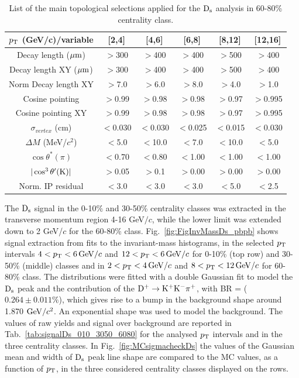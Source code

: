 \begin{table}[!h]
 \begin{center}
  \begin{tabular}{|c|c|c|c|c|c|}
\hline
$p_{\rm T}$ (GeV/c)/variable & [2,4] & [4,6] & [6,8] & [8,12] & [12,16] \\
\hline
\hline
Decay length ($\mathrm{\mu m}$)                 & $>$300 & $>$400 & $>$400 & $>$500 & $>$400\\
\hline
Decay length XY ($\mathrm{\mu m}$)            & $>$300 & $>$400 & $>$400 & $>$500 & $>$400\\
\hline
Norm Decay length XY                   & $>$7.0& $>$6.0 & $>$8.0 & $>$4.0 & $>$1.0\\
\hline
Cosine pointing                               & $>$0.99 & $>$0.98 & $>$0.98 & $>$0.97 & $>$0.995\\
\hline
Cosine pointing XY                          & $>$0.99 & $>$0.98 & $>$0.98 & $>$0.97 & $>$0.995\\
\hline
$\sigma_{vertex}$  (cm)                   & $<$0.030 & $<$0.030 & $<$0.025 & $<$0.015 & $<$0.030\\
\hline
$\Delta M$ (MeV/$c^{2}$) & $<$5.0 & $<$10.0 & $<$7.0 & $<$10.0 & $<$5.0\\
\hline
$\cos \theta^*(\pi)$                             & $<$0.70 & $<$0.80 & $<$1.00 & $<$1.00 & $<$1.00\\
\hline
$|\cos^3 \theta^\prime({\rm K})|$        & $>$0.05 & $>$0.1 & $>$0.00 & $>$0.00 & $>$0.00\\
\hline
Norm. IP residual                               & $<$3.0 & $<$3.0 & $<$3.0 & $<$5.0 & $<$2.5 \\[1ex]
\hline
  \end{tabular}
 \caption{List of the main topological selections applied for the
   ${\rm D_s}$ analysis in 60-80\% centrality class.}
 \label{tab:topologicalselections_ds_6080}
 \end{center}
\end{table}

 The ${\rm D_s}$ signal in the 0-10$\%$ and 30-50\% centrality classes was extracted in the transverse
momentum region 4-16 GeV$/c$, while the lower limit was extended down to 2 GeV/$c$
for the 60-80\% class. Fig.~\ref{fig:FigInvMassDs_pbpb} shows signal extraction
from fits to the invariant-mass histograms, in the selected $p_{\rm T}$ intervals
$4 < p_{\rm T} <6 \, \mathrm{GeV}/c$ and $12 < p_{\rm T} < 6 \, \mathrm{GeV}/c$ for 0-10\% (top row) and 30-50\%
(middle) classes and in $2 < p_{\rm T} < 4 \, \mathrm{GeV}/c$ and  $8 < p_{\rm T} < 12 \, \mathrm{GeV}/c$ for
60-80\% class. The distributions were fitted with a double Gaussian fit to model
the ${\rm D_s}$ peak and the contribution of the ${\rm D^{+}\to K^+ K^-\pi^+}$, with BR = ($0.264 \pm 0.011\%$),
which gives rise to a bump in the background shape around 1.870 $\mathrm{GeV}/c^{2}$. 
An exponential shape was used to model the background.
The values of raw yields and signal over background are reported in
Tab.~\ref{tab:signalDs_010_3050_6080} for the analysed $p_{\rm T}$ intervals and in the three centrality classes.
In Fig.~\ref{fig:MCsigmacheckDs} the values of the Gaussian mean and width of ${\rm D_s}$ 
peak line shape are compared to the MC values, as a function of $p_{\rm T}$, in the 
three considered centrality classes displayed on the rows.

